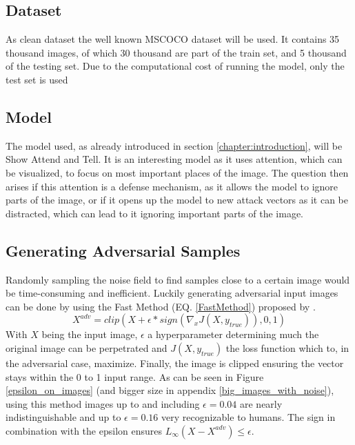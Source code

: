 \subsection{Dataset}
As clean dataset the well known MSCOCO \cite{lin2015microsoft} dataset will be used. It contains 35 thousand images, of which 30 thousand are part of the train set, and 5 thousand of the testing set. Due to the computational cost of running the model, only the test set is used

\subsection{Model}
The model used, as already introduced in section \ref{chapter:introduction}, will be Show Attend and Tell. It is an interesting model as it uses attention, which can be visualized, to focus on most important places of the image. The question then arises if this attention is a defense mechanism, as it allows the model to ignore parts of the image, or if it opens up the model to new attack vectors as it can be distracted, which can lead to it ignoring important parts of the image.

\subsection{Generating Adversarial Samples}
Randomly sampling the noise field to find samples close to a certain image would be time-consuming and inefficient. Luckily generating adversarial input images can be done by using the Fast Method (EQ. \ref{FastMethod}) proposed by \citeauthor{goodfellow2015explaining}.
\begin{equation}
    X^{adv} = clip(X + \epsilon * sign(\nabla_{x}J(X, y_{true})), 0, 1)
    \label{FastMethod}
\end{equation}
With $X$ being the input image, $\epsilon$ a hyperparameter determining much the original image can be perpetrated and $J(X, y_{true})$ the loss function which to, in the adversarial case, maximize. Finally, the image is clipped ensuring the vector stays within the 0 to 1 input range. As can be seen in Figure \ref{epsilon_on_images} (and bigger size in appendix \ref{big_images_with_noise}), using this method images up to and including $\epsilon=0.04$ are nearly indistinguishable and up to $\epsilon=0.16$ very recognizable to humans. The sign in combination with the epsilon ensures $L_{\infty}(X - X^{adv}) \leq \epsilon$.

